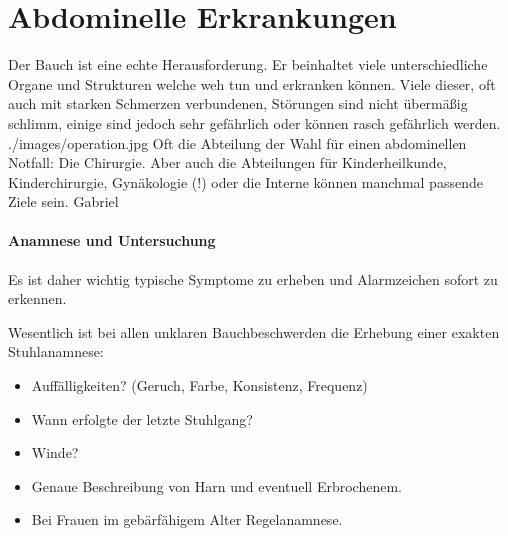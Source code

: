 





\section{Abdominelle Erkrankungen}



{%
Der Bauch ist eine echte Herausforderung. Er
beinhaltet viele unterschiedliche Organe und Strukturen
welche weh tun und
erkranken können. Viele dieser, oft auch mit starken Schmerzen verbundenen, Störungen
sind nicht übermäßig schlimm, einige sind jedoch sehr gefährlich oder können rasch
gefährlich werden. 
}
{}
{./images/operation.jpg}
{\AuthNotesPicLegalOk{}{}Oft die
    Abteilung der Wahl für einen abdominellen Notfall: Die
    Chirurgie. Aber auch die Abteilungen für
    Kinderheilkunde, Kinderchirurgie, Gynäkologie (!) oder
    die Interne können manchmal passende Ziele sein.
    }{Gabriel}


\paragraph{Anamnese und Untersuchung} Es ist daher wichtig
typische Symptome zu erheben und Alarmzeichen sofort zu erkennen.

Wesentlich ist bei allen unklaren Bauchbeschwerden die Erhebung einer exakten Stuhlanamnese:

\begin{itemize}
  \item Auffälligkeiten? (Geruch, Farbe, Konsistenz, Frequenz)
  \item Wann erfolgte der letzte Stuhlgang?
  \item Winde?
  \item Genaue Beschreibung von Harn und eventuell Erbrochenem.
  \item Bei Frauen im gebärfähigem Alter Regelanamnese.
\end{itemize}

